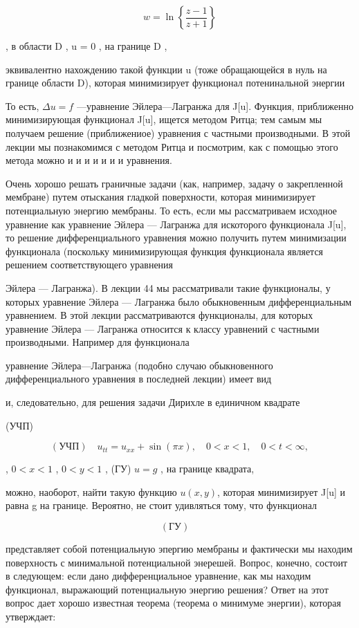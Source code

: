 \documentclass[
  ukrainian,
]{article}
\begin{document}
\[
w = \ln\left\{\frac{z-1}{z+1}\right\}
\]

, в области D , u = 0 , на границе D ,

эквивалентно нахождению такой функции u (тоже обращающейся в нуль на
границе области D), которая минимизирует функционал потенинальной
энергии

То есть, \(\Delta u = f\) ---уравнение Эйлера---Лагранжа для J{[}u{]}.
Функция, приближенно минимизирующая функционал J{[}u{]}, ищется методом
Ритца; тем самым мы получаем решение (приближениое) уравнения с частными
производными. В этой лекции мы познакомимся с методом Ритца и посмотрим,
как с помощью этого метода можно и и и и и и и уравнения.

Очень хорошо решать граничные задачи (как, например, задачу о
закрепленной мембране) путем отыскания гладкой поверхности, которая
минимизирует потенциальную энергию мембраны. То есть, если мы
рассматриваем исходное уравнение как уравнение Эйлера --- Лагранжа для
искоторого функционала J{[}u{]}, то решение дифференциального уравнения
можно получить путем минимизации функционала (поскольку минимизирующая
функция функционала является решением соответствующего уравнения

Эйлера --- Лагранжа). В лекции 44 мы рассматривали такие функционалы, у
которых уравнение Эйлера --- Лагранжа было обыкновенным дифференциальным
уравнением. В этой лекции рассматриваются функционалы, для которых
уравнение Эйлера --- Лагранжа относится к классу уравнений с частными
производными. Например для функционала

уравнение Эйлера---Лагранжа (подобно случаю обыкновенного
дифференциального уравнения в последней лекции) имеет вид

и, следовательно, для решения задачи Дирихле в единичном квадрате

(УЧП)

\[
(\text{УЧП}) \quad u_{tt} = u_{xx} + \sin(\pi x), \quad 0 < x < 1, \quad 0 < t < \infty,
\]

, \(0 < x < 1\) , \(0 < y < 1\) , (ГУ) \(u = g\) , на границе квадрата,

можно, наоборот, найти такую функцию \(u(x, y)\), которая минимизирует
J{[}u{]} и равна g на границе. Вероятно, не стоит удивляться тому, что
функционал

\[
(\text{ГУ}) \quad
\]

представляет собой потенциальную эпергию мембраны и фактически мы
находим поверхность с минимальной потенциальной энерешей. Вопрос,
конечно, состоит в следующем: если дано дифференциальное уравнение, как
мы находим функционал, выражающий потенциальную энергию решения? Ответ
на этот вопрос дает хорошо известная теорема (теорема о минимуме
энергии), которая утверждает:
\end{document}
